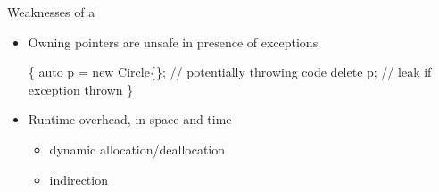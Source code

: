 \begin{frame}[fragile]{Weaknesses of a  \insertcontinuationtext}

  \begin{itemize}
  \item<1-> Owning pointers are unsafe in presence of exceptions
    \begin{codeblock}
\{
  auto p = new Circle\{\ddd\};
  \ddd                         // potentially throwing code
  delete p;                  // leak if exception thrown
\}\end{codeblock}

  \item<2-> Runtime overhead, in space and time
    \begin{itemize}
    \item dynamic allocation/deallocation
    \item indirection
    \end{itemize}
  \end{itemize}

\end{frame}

